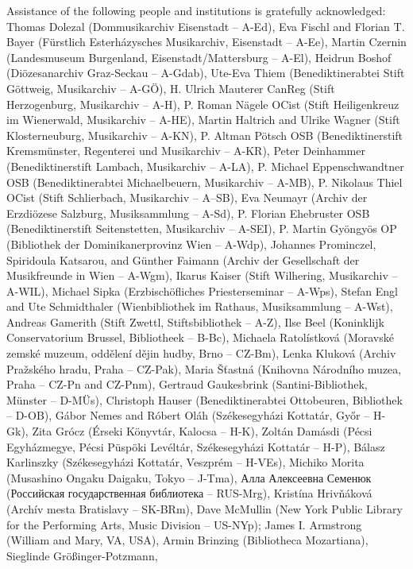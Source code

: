\documentclass{ees}
\begin{document}
Assistance of the following people and institutions is gratefully acknowledged:
Thomas Dolezal (Dommusikarchiv Eisenstadt – A-Ed),
Eva Fischl and Florian T. Bayer (Fürstlich Esterházysches Musikarchiv, Eisenstadt – A-Ee),
Martin Czernin (Landesmuseum Burgenland, Eisenstadt/Mattersburg – A-El),
Heidrun Boshof (Diözesanarchiv Graz-Seckau – A-Gdab),
Ute-Eva Thiem (Benediktinerabtei Stift Göttweig, Musikarchiv – A-GÖ),
H. Ulrich Mauterer CanReg (Stift Herzogenburg, Musikarchiv – A-H),
P. Roman Nägele OCist (Stift Heiligenkreuz im Wienerwald, Musikarchiv – A-HE),
Martin Haltrich and Ulrike Wagner (Stift Klosterneuburg, Musikarchiv – A-KN),
P. Altman Pötsch OSB (Benediktinerstift Kremsmünster, Regenterei und Musikarchiv – A-KR),
Peter Deinhammer (Benediktinerstift Lambach, Musikarchiv – A-LA),
P. Michael Eppenschwandtner OSB (Benediktinerabtei Michaelbeuern, Musikarchiv – A-MB),
P. Nikolaus Thiel OCist (Stift Schlierbach, Musikarchiv – A–SB),
Eva Neumayr (Archiv der Erzdiözese Salzburg, Musiksammlung – A-Sd),
P. Florian Ehebruster OSB (Benediktinerstift Seitenstetten, Musikarchiv – A-SEI),
P. Martin Gyöngyös OP (Bibliothek der Dominikanerprovinz Wien – A-Wdp),
Johannes Prominczel, Spiridoula Katsarou, and Günther Faimann (Archiv der Gesellschaft der Musikfreunde in Wien – A-Wgm),
Ikarus Kaiser (Stift Wilhering, Musikarchiv – A-WIL),
Michael Sipka (Erzbischöfliches Priesterseminar – A-Wps),
Stefan Engl and Ute Schmidthaler (Wienbibliothek im Rathaus, Musiksammlung – A-Wst),
Andreas Gamerith (Stift Zwettl, Stiftsbibliothek – A-Z),
Ilse Beel (Koninklijk Conservatorium Brussel, Bibliotheek – B-Bc),
Michaela Ratolístková (Moravské zemské muzeum, oddělení dějin hudby, Brno  – CZ-Bm),
Lenka Kluková (Archiv Pražského hradu, Praha – CZ-Pak),
Maria Šťastná (Knihovna Národního muzea, Praha – CZ-Pn and CZ-Pnm),
Gertraud Gaukesbrink (Santini-Bibliothek, Münster – D-MÜs),
Christoph Hauser (Benediktinerabtei Ottobeuren, Bibliothek – D-OB),
Gábor Nemes and Róbert Oláh (Székesegyházi Kottatár, Győr – H-Gk),
Zita Grócz (Érseki Könyvtár, Kalocsa – H-K),
Zoltán Damásdi (Pécsi Egyházmegye, Pécsi Püspöki Levéltár, Székesegyházi Kottatár – H-P),
Bálasz Karlinszky (Székesegyházi Kottatár, Veszprém – H-VEs),
Michiko Morita (Musashino Ongaku Daigaku, Tokyo – J-Tma),
Алла Алексеевна Семенюк (Российская государственная библиотека – RUS-Mrg),
Kristína Hrivňáková (Archív mesta Bratislavy – SK-BRm),
Dave McMullin (New York Public Library for the Performing Arts, Music Division – US-NYp);
James I. Armstrong (William and Mary, VA, USA),
Armin Brinzing (Bibliotheca Mozartiana),
Sieglinde Größinger-Potzmann,
\end{document}
